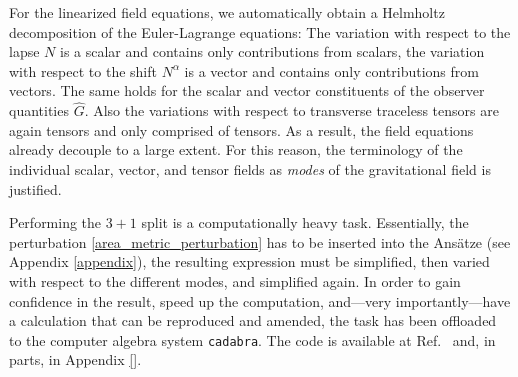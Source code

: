 For the linearized field equations, we automatically obtain a Helmholtz decomposition of the Euler-Lagrange equations: The variation with respect to the lapse $N$ is a scalar and contains only contributions from scalars, the variation with respect to the shift $N^\alpha$ is a vector and contains only contributions from vectors. The same holds for the scalar and vector constituents of the observer quantities $\hat G$. Also the variations with respect to transverse traceless tensors are again tensors and only comprised of tensors. As a result, the field equations already decouple to a large extent. For this reason, the terminology of the individual scalar, vector, and tensor fields as \emph{modes} of the gravitational field is justified.

Performing the $3+1$ split is a computationally heavy task. Essentially, the perturbation \eqref{area_metric_perturbation} has to be inserted into the Ansätze (see Appendix \ref{appendix}), the resulting expression must be simplified, then varied with respect to the different modes, and simplified again. In order to gain confidence in the result, speed up the computation, and---very importantly---have a calculation that can be reproduced and amended, the task has been offloaded to the computer algebra system \texttt{cadabra}\cite{Peeters2007,Peeters_2018}. The code is available at Ref.~\cite{Alex_2020_area-metric-gravity} and, in parts, in Appendix \ref{}.

